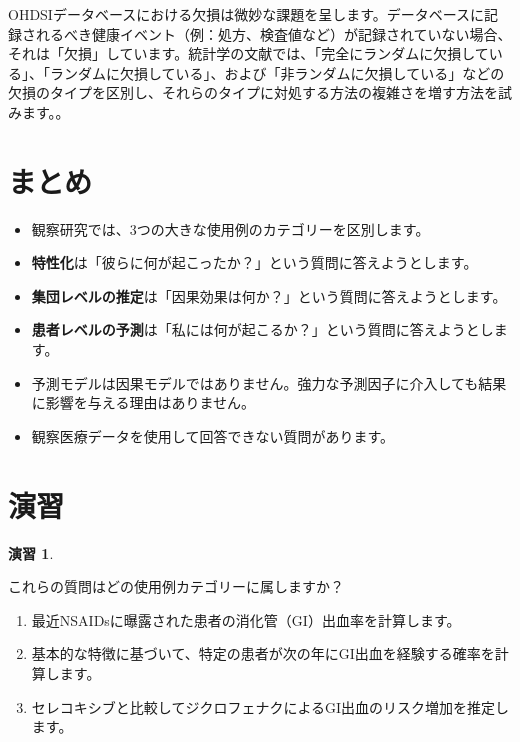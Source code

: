 \documentclass[
  11pt]{book}
\makeatletter
\newenvironment{kframe}{%
\medskip{}
\setlength{\fboxsep}{.8em}
 \def\at@end@of@kframe{}%
 \ifinner\ifhmode%
  \def\at@end@of@kframe{\end{minipage}}%
  \begin{minipage}{\columnwidth}%
 \fi\fi%
 \def\FrameCommand##1{\hskip\@totalleftmargin \hskip-\fboxsep
 \colorbox{myShadeColor}{##1}\hskip-\fboxsep
     \hskip-\linewidth \hskip-\@totalleftmargin \hskip\columnwidth}%
 \MakeFramed {\advance\hsize-\width
   \@totalleftmargin\z@ \linewidth\hsize
   \@setminipage}}%
 {\par\unskip\endMakeFramed%
 \at@end@of@kframe}
\newenvironment{rmdblock}[1]
  {
  \begin{itemize}
  \renewcommand{\labelitemi}{
    \raisebox{-.7\height}[0pt][0pt]{
      {\setkeys{Gin}{width=3em,keepaspectratio}\texttt{[image: images/\#1]}}
    }
  }
  \setlength{\fboxsep}{1em}
  \begin{kframe}
  \item
  }
  {
  \end{kframe}
  \end{itemize}
  }
\newenvironment{rmdsummary}
  {\begin{rmdblock}{summary}}
  {\end{rmdblock}}
\theoremstyle{definition}
\theoremstyle{definition}
\theoremstyle{definition}
\newtheorem{exercise}{演習}[chapter]
\theoremstyle{definition}
\theoremstyle{remark}
\makeatother
\begin{document}

OHDSIデータベースにおける欠損は微妙な課題を呈します。データベースに記録されるべき健康イベント（例：処方、検査値など）が記録されていない場合、それは「欠損」しています。統計学の文献では、「完全にランダムに欠損している」、「ランダムに欠損している」、および「非ランダムに欠損している」などの欠損のタイプを区別し、それらのタイプに対処する方法の複雑さを増す方法を試みます。\citet{perkins2017principledはこのトピックに関する有用な入門書を提供しています}。

\section{まとめ}\label{ux307eux3068ux3081-5}

\begin{rmdsummary}
\begin{itemize}
\item
  観察研究では、3つの大きな使用例のカテゴリーを区別します。
\item
  \textbf{特性化}は「彼らに何が起こったか？」という質問に答えようとします。
\item
  \textbf{集団レベルの推定}は「因果効果は何か？」という質問に答えようとします。
\item
  \textbf{患者レベルの予測}は「私には何が起こるか？」という質問に答えようとします。
\item
  予測モデルは因果モデルではありません。強力な予測因子に介入しても結果に影響を与える理由はありません。
\item
  観察医療データを使用して回答できない質問があります。
\end{itemize}
\end{rmdsummary}

\section{演習}\label{ux6f14ux7fd2-2}

\begin{exercise}
\protect\hypertarget{exr:exerciseUseCases1}{}\label{exr:exerciseUseCases1}

これらの質問はどの使用例カテゴリーに属しますか？

\begin{enumerate}
\def\labelenumi{\arabic{enumi}.}
\item
  最近NSAIDsに曝露された患者の消化管（GI）出血率を計算します。
\item
  基本的な特徴に基づいて、特定の患者が次の年にGI出血を経験する確率を計算します。
\item
  セレコキシブと比較してジクロフェナクによるGI出血のリスク増加を推定します。
\end{enumerate}

\end{exercise}
\end{document}
